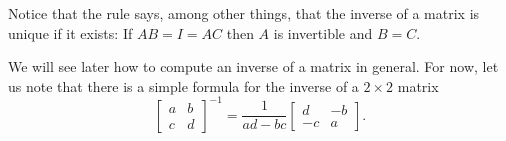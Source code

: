 Notice that the rule says, among other things, that the
inverse of a matrix is unique if it exists:  If $AB = I = AC$ then $A$ is
invertible and $B=C$.

We will see later how to compute an inverse of a matrix
in general.  For now,
let us note that there is a simple formula for the inverse of
a $2 \times 2$ matrix
\begin{equation*}
\begin{bmatrix}
a & b \\
c & d
\end{bmatrix}^{-1}
=
\frac{1}{ad-bc}
\begin{bmatrix}
d & -b \\
-c & a
\end{bmatrix} .
\end{equation*}

